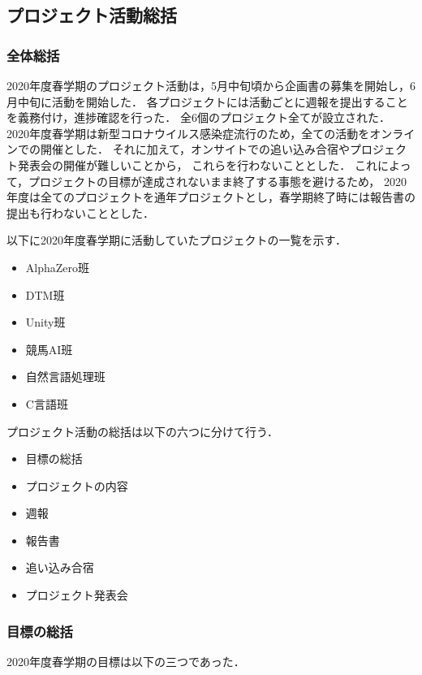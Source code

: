 \subsection*{プロジェクト活動総括}


\subsubsection*{全体総括}
2020年度春学期のプロジェクト活動は，5月中旬頃から企画書の募集を開始し，6月中旬に活動を開始した．
各プロジェクトには活動ごとに週報を提出することを義務付け，進捗確認を行った．
全6個のプロジェクト全てが設立された．
2020年度春学期は新型コロナウイルス感染症流行のため，全ての活動をオンラインでの開催とした．
それに加えて，オンサイトでの追い込み合宿やプロジェクト発表会の開催が難しいことから，
これらを行わないこととした．
これによって，プロジェクトの目標が達成されないまま終了する事態を避けるため，
2020年度は全てのプロジェクトを通年プロジェクトとし，春学期終了時には報告書の提出も行わないこととした．

以下に2020年度春学期に活動していたプロジェクトの一覧を示す．

\begin{itemize}
\item AlphaZero班
\item DTM班
\item Unity班
\item 競馬AI班
\item 自然言語処理班
\item C言語班
\end{itemize}

プロジェクト活動の総括は以下の六つに分けて行う．

\begin{itemize}
\item 目標の総括
\item プロジェクトの内容
\item 週報
\item 報告書
\item 追い込み合宿
\item プロジェクト発表会
\end{itemize}

\subsubsection*{目標の総括}
2020年度春学期の目標は以下の三つであった．

